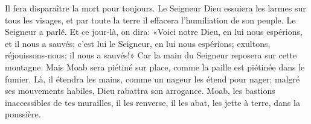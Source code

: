 Il fera disparaître la mort pour toujours.
Le Seigneur Dieu essuiera les larmes sur tous les visages,
	et par toute la terre il effacera l’humiliation de son peuple.
	Le Seigneur a parlé.
Et ce jour-là, on dira: «Voici notre Dieu, en lui nous espérions, et il nous a sauvés;
	c’est lui le Seigneur, en lui nous espérions;
	exultons, réjouissons-nous: il nous a sauvés!»
Car la main du Seigneur reposera sur cette montagne.
Mais Moab sera piétiné sur place, comme la paille est piétinée dans le fumier.
	Là, il étendra les mains, comme un nageur les étend pour nager;
	malgré ses mouvements habiles, Dieu rabattra son arrogance.
Moab, les bastions inaccessibles de tes murailles, il les renverse, il les abat,
	les jette à terre, dans la poussière.
